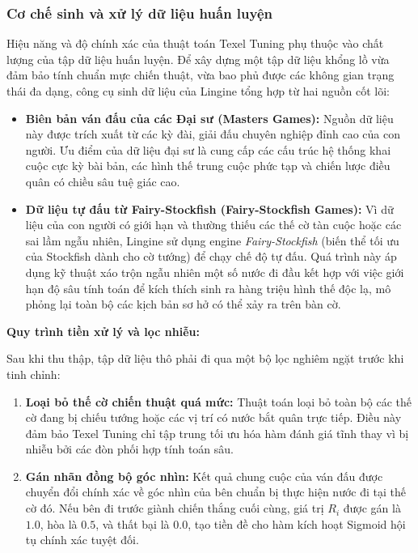 \subsubsection{Cơ chế sinh và xử lý dữ liệu huấn luyện}

Hiệu năng và độ chính xác của thuật toán Texel Tuning phụ thuộc vào chất lượng của tập dữ liệu huấn luyện. Để xây dựng một tập dữ liệu khổng lồ vừa đảm bảo tính chuẩn mực chiến thuật, vừa bao phủ được các không gian trạng thái đa dạng, công cụ sinh dữ liệu của Lingine tổng hợp từ hai nguồn cốt lõi:

\begin{itemize}
    \item \textbf{Biên bản ván đấu của các Đại sư (Masters Games):} Nguồn dữ liệu này được trích xuất từ các kỳ đài, giải đấu chuyên nghiệp đỉnh cao của con người. Ưu điểm của dữ liệu đại sư là cung cấp các cấu trúc hệ thống khai cuộc cực kỳ bài bản, các hình thế trung cuộc phức tạp và chiến lược điều quân có chiều sâu tuệ giác cao.
    \item \textbf{Dữ liệu tự đấu từ Fairy-Stockfish (Fairy-Stockfish Games):} Vì dữ liệu của con người có giới hạn và thường thiếu các thế cờ tàn cuộc hoặc các sai lầm ngẫu nhiên, Lingine sử dụng engine \textit{Fairy-Stockfish} (biến thể tối ưu của Stockfish dành cho cờ tướng) để chạy chế độ tự đấu. Quá trình này áp dụng kỹ thuật xáo trộn ngẫu nhiên một số nước đi đầu kết hợp với việc giới hạn độ sâu tính toán để kích thích sinh ra hàng triệu hình thế độc lạ, mô phỏng lại toàn bộ các kịch bản sơ hở có thể xảy ra trên bàn cờ.
\end{itemize}

\textbf{Quy trình tiền xử lý và lọc nhiễu:}

Sau khi thu thập, tập dữ liệu thô phải đi qua một bộ lọc nghiêm ngặt trước khi tinh chỉnh:

\begin{enumerate}
    \item \textbf{Loại bỏ thế cờ chiến thuật quá mức:} Thuật toán loại bỏ toàn bộ các thế cờ đang bị chiếu tướng hoặc các vị trí có nước bắt quân trực tiếp. Điều này đảm bảo Texel Tuning chỉ tập trung tối ưu hóa hàm đánh giá tĩnh thay vì bị nhiễu bởi các đòn phối hợp tính toán sâu.
    \item \textbf{Gán nhãn đồng bộ góc nhìn:} Kết quả chung cuộc của ván đấu được chuyển đổi chính xác về góc nhìn của bên chuẩn bị thực hiện nước đi tại thế cờ đó. Nếu bên đi trước giành chiến thắng cuối cùng, giá trị $R_i$ được gán là $1.0$, hòa là $0.5$, và thất bại là $0.0$, tạo tiền đề cho hàm kích hoạt Sigmoid hội tụ chính xác tuyệt đối.
\end{enumerate}

